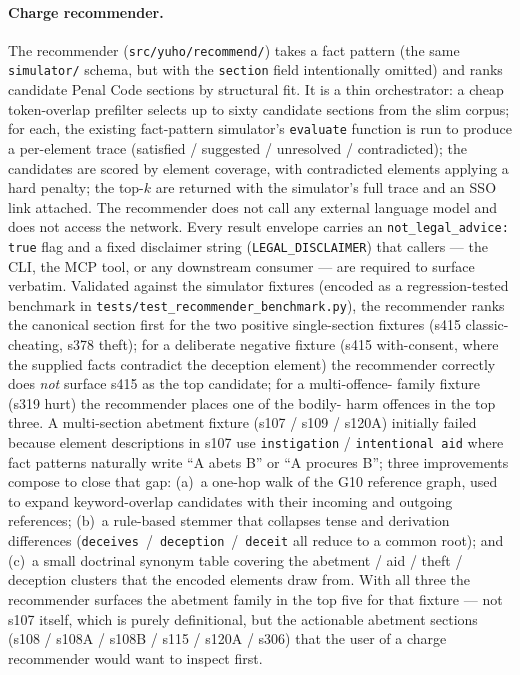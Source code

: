 \paragraph{Charge recommender.} The recommender
(\texttt{src/yuho/recommend/}) takes a fact pattern (the same
\texttt{simulator/} schema, but with the \texttt{section} field
intentionally omitted) and ranks candidate Penal Code sections by
structural fit. It is a thin orchestrator: a cheap token-overlap
prefilter selects up to sixty candidate sections from the slim
corpus; for each, the existing fact-pattern simulator's
\texttt{evaluate} function is run to produce a per-element trace
(satisfied / suggested / unresolved / contradicted); the candidates
are scored by element coverage, with contradicted elements applying
a hard penalty; the top-$k$ are returned with the simulator's full
trace and an SSO link attached.
The recommender does not call any external language model and does
not access the network. Every result envelope carries an
\texttt{not\_legal\_advice: true} flag and a fixed disclaimer string
(\texttt{LEGAL\_DISCLAIMER}) that callers --- the CLI, the MCP tool,
or any downstream consumer --- are required to surface verbatim.
Validated against the simulator fixtures (encoded as a
regression-tested benchmark in
\texttt{tests/test\_recommender\_benchmark.py}), the recommender
ranks the canonical section first for the two positive single-section
fixtures (s415 classic-cheating, s378 theft); for a deliberate
negative fixture (s415 with-consent, where the supplied facts
contradict the deception element) the recommender correctly does
\emph{not} surface s415 as the top candidate; for a multi-offence-
family fixture (s319 hurt) the recommender places one of the bodily-
harm offences in the top three. A multi-section abetment fixture
(s107 / s109 / s120A) initially failed because element descriptions
in s107 use \texttt{instigation} / \texttt{intentional aid} where
fact patterns naturally write ``A abets B'' or ``A procures B'';
three improvements compose to close that gap: (a)~a one-hop walk of
the G10 reference graph, used to expand keyword-overlap candidates
with their incoming and outgoing references; (b)~a rule-based
stemmer that collapses tense and derivation differences
(\texttt{deceives}~/~\texttt{deception}~/~\texttt{deceit} all reduce
to a common root); and (c)~a small doctrinal synonym table covering
the abetment / aid / theft / deception clusters that the encoded
elements draw from. With all three the recommender surfaces the
abetment family in the top five for that fixture --- not s107
itself, which is purely definitional, but the actionable abetment
sections (s108 / s108A / s108B / s115 / s120A / s306) that the user
of a charge recommender would want to inspect first.

